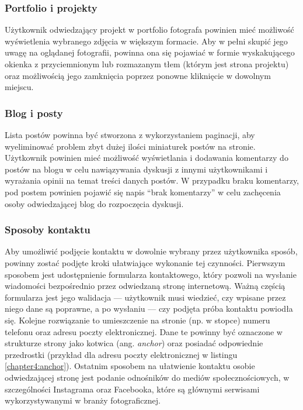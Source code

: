 \documentclass[a4paper, 12pt]{article}
\numberwithin{figure}{section}
\begin{document}
\begin{sloppypar}
\subsubsection*{Portfolio i projekty}

Użytkownik odwiedzający projekt w portfolio fotografa powinien mieć możliwość wyświetlenia wybranego zdjęcia w większym formacie. Aby w pełni skupić jego uwagę na oglądanej fotografii, powinna ona się pojawiać w formie wyskakującego okienka z przyciemnionym lub rozmazanym tłem (którym jest strona projektu) oraz możliwością jego zamknięcia poprzez ponowne kliknięcie w dowolnym miejscu. 

\subsubsection*{Blog i posty}

Lista postów powinna być stworzona z wykorzystaniem paginacji, aby wyeliminować problem zbyt dużej ilości miniaturek postów na stronie. Użytkownik powinien mieć możliwość wyświetlania i dodawania komentarzy do postów na blogu w celu nawiązywania dyskusji z innymi użytkownikami i wyrażania opinii na temat treści danych postów. W przypadku braku komentarzy, pod postem powinien pojawić się napis ``brak komentarzy'' w celu zachęcenia osoby odwiedzającej blog do rozpoczęcia dyskusji. 


\subsubsection*{Sposoby kontaktu}

Aby umożliwić podjęcie kontaktu w dowolnie wybrany przez użytkownika sposób, powinny zostać podjęte kroki ułatwiające wykonanie tej czynności. Pierwszym sposobem jest udostępnienie formularza kontaktowego, który pozwoli na wysłanie wiadomości bezpośrednio przez odwiedzaną stronę internetową. Ważną częścią formularza jest jego walidacja --- użytkownik musi wiedzieć, czy wpisane przez niego dane są poprawne, a po wysłaniu --- czy podjęta próba kontaktu powiodła się. Kolejne rozwiązanie to umieszczenie na stronie (np. w stopce) numeru telefonu oraz adresu poczty elektronicznej. Dane te powinny być oznaczone w strukturze strony jako kotwica (ang. \textit{anchor}) oraz posiadać odpowiednie przedrostki (przykład dla adresu poczty elektronicznej w listingu \ref{chapter4:anchor}). Ostatnim sposobem na ułatwienie kontaktu osobie odwiedzającej stronę jest podanie odnośników do mediów społecznościowych, w szczególności Instagrama oraz Facebooka, które są głównymi serwisami wykorzystywanymi w branży fotograficznej.


\end{sloppypar}
\end{document}
